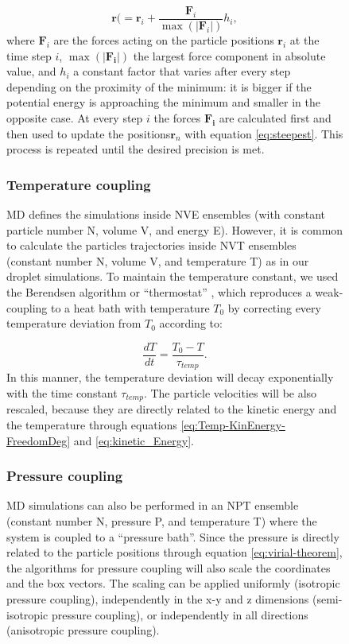 \begin{center}
\begin{figure}[H]
\begin{minipage}[t]{0.55\columnwidth}
\begin{equation}
\mathbf{r}(=\mathbf{r}_{i}+\frac{\mathbf{F}_{i}}{\max(\left|\mathbf{F}_{i}\right|)}h_{i},\label{eq:steepest}
\end{equation}
where $\mathbf{F}_{i}$ are the forces acting on the particle positions
$\mathbf{r}_{i}$ at the time step $i$, $\max(\left|\mathbf{F_{i}}\right|)$
the largest force component in absolute value, and $h_{i}$ a constant
factor that varies after every step depending on the proximity of
the minimum: it is bigger if the potential energy is approaching the
minimum and smaller in the opposite case. At every step $i$ the forces
$\mathbf{F_{i}}$ are calculated first and then used to update the
positions$\mathbf{r}_{n}$ with equation \ref{eq:steepest}. This
process is repeated until the desired precision is met.

\subsubsection{Temperature coupling}

MD defines the simulations inside NVE ensembles (with constant particle
number N, volume V, and energy E). However, it is common to calculate
the particles trajectories inside NVT ensembles (constant number N,
volume V, and temperature T) as in our droplet simulations. To maintain
the temperature constant, we used the Berendsen algorithm or ``thermostat''
\cite{berendsen:1984}, which reproduces a weak-coupling to a heat
bath with temperature $T_{0}$ by correcting every temperature deviation
from $T_{0}$ according to:

\begin{equation}
\frac{dT}{dt}=\frac{T_{0}-T}{\tau_{temp}}.\label{eq:Berendsen}
\end{equation}
In this manner, the temperature deviation will decay exponentially
with the time constant $\tau_{temp}$. The particle velocities will
be also rescaled, because they are directly related to the kinetic
energy and the temperature through equations \ref{eq:Temp-KinEnergy-FreedomDeg}
and \ref{eq:kinetic_Energy}.

\subsubsection{Pressure coupling}

MD simulations can also be performed in an NPT ensemble (constant
number N, pressure P, and temperature T) where the system is coupled
to a \textquotedblleft pressure bath\textquotedblright . Since the
pressure is directly related to the particle positions through equation
\ref{eq:virial-theorem}, the algorithms for pressure coupling will
also scale the coordinates and the box vectors. The scaling can be
applied uniformly (isotropic pressure coupling), independently in
the x-y and z dimensions (semi-isotropic pressure coupling), or independently
in all directions (anisotropic pressure coupling).


\end{minipage}
\end{figure}
\end{center}
